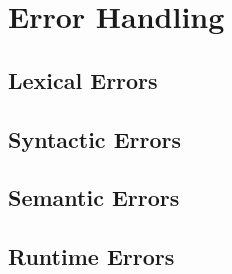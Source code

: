\section{Error Handling}

\subsection{Lexical Errors}

\subsection{Syntactic Errors}

\subsection{Semantic Errors}

\subsection{Runtime Errors}